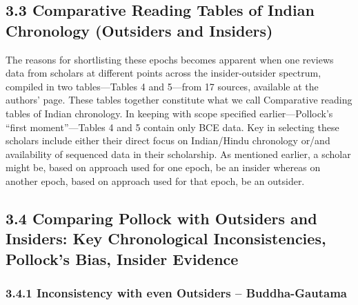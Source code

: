 \vspace{-0.7cm}

\subsection*{3.3 Comparative Reading Tables of Indian Chronology (Outsiders and Insiders)}

\vspace{-0.3cm}

The reasons for shortlisting these epochs becomes apparent when one reviews data from scholars at different points across the insider-outsider spectrum, compiled in two tables—Tables 4 and 5—from 17 sources, available at the authors’ page. These tables together constitute what we call Comparative reading tables of Indian chronology. In keeping with scope specified earlier—Pollock’s “first moment”—Tables 4 and 5 contain only BCE data. Key in selecting these scholars include either their direct focus on Indian/Hindu chronology or/and availability of sequenced data in their scholarship. As mentioned earlier, a scholar might be, based on approach used for one epoch, be an insider whereas on another epoch, based on approach used for that epoch, be an outsider.

\vfill\eject

\subsection*{3.4 Comparing Pollock with Outsiders and Insiders: Key Chronological Inconsistencies, Pollock’s Bias, Insider Evidence}

\subsubsection*{3.4.1 Inconsistency with even Outsiders – Buddha-Gautama}

